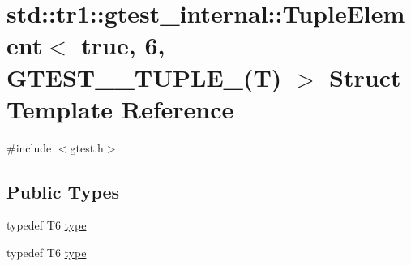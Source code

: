 \hypertarget{structstd_1_1tr1_1_1gtest__internal_1_1_tuple_element_3_01true_00_016_00_01_g_t_e_s_t__10___t_u_p_l_e___07_t_08_01_4}{\section{std\-:\-:tr1\-:\-:gtest\-\_\-internal\-:\-:Tuple\-Element$<$ true, 6, G\-T\-E\-S\-T\-\_\-\_\-\-T\-U\-P\-L\-E\-\_\-(T) $>$ Struct Template Reference}
\label{structstd_1_1tr1_1_1gtest__internal_1_1_tuple_element_3_01true_00_016_00_01_g_t_e_s_t__10___t_u_p_l_e___07_t_08_01_4}
}


{\ttfamily \#include $<$gtest.\-h$>$}

\subsection*{Public Types}
\begin{DoxyCompactItemize}
\item 
typedef T6 \hyperlink{structstd_1_1tr1_1_1gtest__internal_1_1_tuple_element_3_01true_00_016_00_01_g_t_e_s_t__10___t_u_p_l_e___07_t_08_01_4_a929a5e4d1a751f3d1a5780643f69a121}{type}
\item 
typedef T6 \hyperlink{structstd_1_1tr1_1_1gtest__internal_1_1_tuple_element_3_01true_00_016_00_01_g_t_e_s_t__10___t_u_p_l_e___07_t_08_01_4_a929a5e4d1a751f3d1a5780643f69a121}{type}
\end{DoxyCompactItemize}


